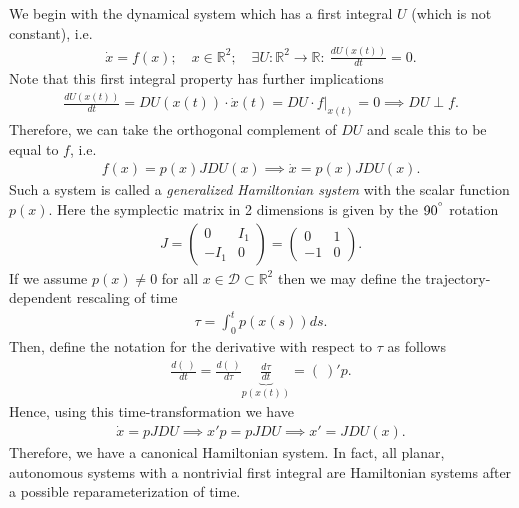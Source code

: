 \begin{ex}
	We begin with the dynamical system which has a first integral $U$ (which is not constant), i.e.
	\begin{align}
		\dot{x} = f(x);\quad x \in \mathbb{R}^{2};\quad \exists U:\mathbb{R}^{2}\to \mathbb{R}:\ \frac{dU(x(t))}{dt}=0.
	\end{align}
	Note that this first integral property has further implications
	\begin{align}
		\frac{dU(x(t))}{dt} = DU(x(t)) \cdot \dot{x}(t) = DU \cdot \left.f\right|_{x(t)} = 0 \implies DU \perp f.
	\end{align}
Therefore, we can take the orthogonal complement of $DU$ and scale this to be equal to $f$, i.e.
\begin{align}
	f(x) = p(x) JDU(x) \implies \dot{x} = p(x) JDU(x).
\end{align}
Such a system is called a \emph{generalized Hamiltonian system} with the scalar function $p(x)$. Here the symplectic matrix in 2 dimensions is given by the $90^{\degree}$ rotation
\begin{align}
	J = 
	\begin{pmatrix}
		0 & I_{1}\\
		-I_{1} & 0 
	\end{pmatrix}
	=
	\begin{pmatrix}
		0 & 1 \\
		-1 & 0
	\end{pmatrix}
	.
\end{align}
If we assume $p(x)\neq0$ for all $x\in \mathcal{D} \subset \mathbb{R}^{2}$ then we may define the trajectory-dependent rescaling of time
\begin{align}
	\tau = \int_{0}^{t} p(x(s))ds.
\end{align}
Then, define the notation for the derivative with respect to $\tau$ as follows
 \begin{align}
	 \frac{d(\ )}{dt} = \frac{d(\ )}{d\tau} \underbrace{\frac{d\tau }{dt}}_{p(x(t))} = (\ )' p.
\end{align}
Hence, using this time-transformation we have
\begin{align}
	\dot{x} = pJDU \implies x'p = pJDU \implies \boxed{x' = JDU(x).}
\end{align}
Therefore, we have a canonical Hamiltonian system. In fact, all planar, autonomous systems with a nontrivial first integral are Hamiltonian systems after a possible reparameterization of time.
\end{ex}

